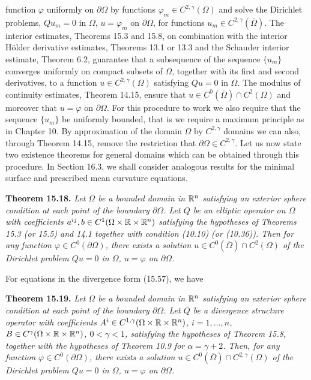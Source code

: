 function $\varphi$ uniformly on $\partial\Omega$ by functions $\varphi_m \in C^{2,\gamma}(\Omega)$ and solve the Dirichlet problems, $Qu_m = 0$ in $\Omega$, $u = \varphi_m$ on $\partial\Omega$, for functions $u_m \in C^{2,\gamma}(\overline{\Omega})$. The interior estimates, Theorems 15.3 and 15.8, on combination with the interior Hölder derivative estimates, Theorems 13.1 or 13.3 and the Schauder interior estimate, Theorem 6.2, guarantee that a subsequence of the sequence $\{u_m\}$ converges uniformly on compact subsets of $\Omega$, together with its first and second derivatives, to a function $u \in C^{2,\gamma}(\Omega)$ satisfying $Qu=0$ in $\Omega$. The modulus of continuity estimates, Theorem 14.15, ensure that $u \in C^0(\overline{\Omega}) \cap C^{2}(\Omega)$ and moreover that $u=\varphi$ on $\partial\Omega$. For this procedure to work we also require that the sequence $\{u_m\}$ be uniformly bounded, that is we require a maximum principle as in Chapter 10. By approximation of the domain $\Omega$ by $C^{2,\gamma}$ domains we can also, through Theorem 14.15, remove the restriction that $\partial\Omega \in C^{2,\gamma}$. Let us now state two existence theorems for general domains which can be obtained through this procedure. In Section 16.3, we shall consider analogous results for the minimal surface and prescribed mean curvature equations.

\medskip

\textbf{Theorem 15.18.} \emph{Let $\Omega$ be a bounded domain in $\mathbb{R}^n$ satisfying an exterior sphere condition at each point of the boundary $\partial\Omega$. Let $Q$ be an elliptic operator on $\Omega$ with coefficients $a^{ij}, b \in C^{1}(\Omega \times \mathbb{R} \times \mathbb{R}^n)$ satisfying the hypotheses of Theorems 15.3 (or 15.5) and 14.1 together with condition (10.10) (or (10.36)). Then for any function $\varphi \in C^0(\partial\Omega)$, there exists a solution $u \in C^0(\overline{\Omega}) \cap C^{2}(\Omega)$ of the Dirichlet problem $Qu = 0$ in $\Omega$, $u = \varphi$ on $\partial\Omega$.}

\medskip

For equations in the divergence form (15.57), we have

\medskip

\textbf{Theorem 15.19.} \emph{Let $\Omega$ be a bounded domain in $\mathbb{R}^n$ satisfying an exterior sphere condition at each point of the boundary $\partial\Omega$. Let $Q$ be a divergence structure operator with coefficients $A^i \in C^{1,\gamma}(\Omega \times \mathbb{R} \times \mathbb{R}^n)$, $i=1,\dots,n$, $B \in C^{\gamma}(\Omega \times \mathbb{R} \times \mathbb{R}^n)$, $0 < \gamma < 1$, satisfying the hypotheses of Theorem 15.8, together with the hypotheses of Theorem 10.9 for $\alpha = \gamma + 2$. Then, for any function $\varphi \in C^0(\partial\Omega)$, there exists a solution $u \in C^0(\overline{\Omega}) \cap C^{2,\gamma}(\Omega)$ of the Dirichlet problem $Qu=0$ in $\Omega$, $u=\varphi$ on $\partial\Omega$.}

